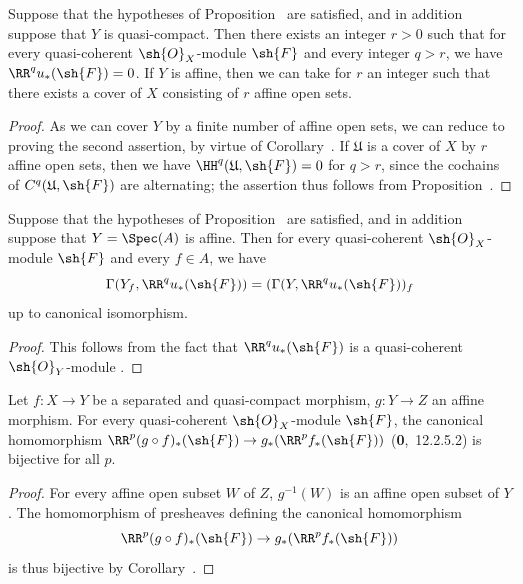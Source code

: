 \begin{corollary}[1.4.12]
\label{III.1.4.12}
Suppose that the hypotheses of Proposition~ are satisfied, and in addition suppose that $Y$ is quasi-compact.
Then there exists an integer $r>0$ such that for every quasi-coherent $\sh{O}_X$-module $\sh{F}$ and every integer $q>r$, we have $\RR^q u_*(\sh{F})=0$.
If $Y$ is affine, then we can take for $r$ an integer such that there exists a cover of $X$ consisting of $r$ affine open sets.
\end{corollary}

\begin{proof}
As we can cover $Y$ by a finite number of affine open sets, we can reduce to proving the second assertion, by virtue of Corollary~.
If $\mathfrak{U}$ is a cover of $X$ by $r$ affine open sets, then we have $\HH^q(\mathfrak{U},\sh{F})=0$ for $q>r$, since the cochains of $C^q(\mathfrak{U},\sh{F})$ are alternating; the assertion thus follows from Proposition~.
\end{proof}

\begin{corollary}[1.4.13]
\label{III.1.4.13}
Suppose that the hypotheses of Proposition~ are satisfied, and in addition suppose that $Y=\Spec(A)$ is affine.
Then for every quasi-coherent $\sh{O}_X$-module $\sh{F}$ and every $f\in A$, we have
\[
  \Gamma(Y_f,\RR^q u_*(\sh{F}))=(\Gamma(Y,\RR^q u_*(\sh{F}))_f
\]
up to canonical isomorphism.
\end{corollary}

\begin{proof}
This follows from the fact that $\RR^q u_*(\sh{F})$ is a quasi-coherent $\sh{O}_Y$-module .
\end{proof}

\begin{proposition}[1.4.14]
\label{III.1.4.14}
Let $f:X\to Y$ be a separated and quasi-compact morphism, $g:Y\to Z$ an affine morphism.
For every quasi-coherent $\sh{O}_X$-module $\sh{F}$, the canonical homomorphism $\RR^p(g\circ f)_*(\sh{F})\to g_*(\RR^p f_*(\sh{F}))$ (\textbf{0},~12.2.5.2) is bijective for all $p$.
\end{proposition}

\begin{proof}
For every affine open subset $W$ of $Z$, $g^{-1}(W)$ is an affine open subset of $Y$.
The homomorphism of presheaves defining the canonical homomorphism
\[
  \RR^p(g\circ f)_*(\sh{F})\to g_*(\RR^p f_*(\sh{F}))
\]
 is thus bijective by Corollary~.
\end{proof}

